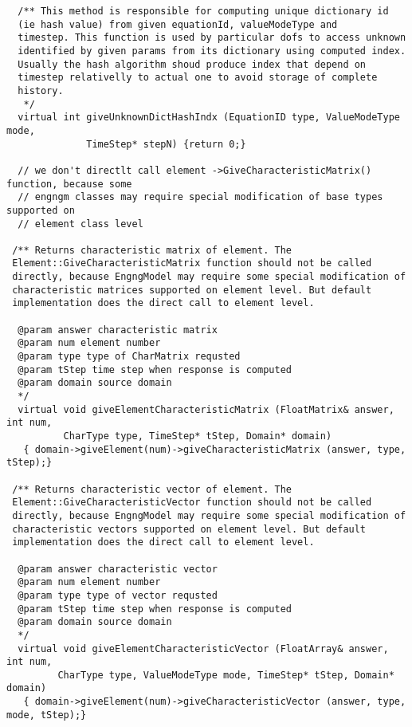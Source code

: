 \documentclass[12pt,draft]{article}
\begin{document}
{\begin{verbatim}
  /** This method is responsible for computing unique dictionary id
  (ie hash value) from given equationId, valueModeType and
  timestep. This function is used by particular dofs to access unknown
  identified by given params from its dictionary using computed index.
  Usually the hash algorithm shoud produce index that depend on
  timestep relativelly to actual one to avoid storage of complete
  history.
   */
  virtual int giveUnknownDictHashIndx (EquationID type, ValueModeType mode, 
              TimeStep* stepN) {return 0;}

  // we don't directlt call element ->GiveCharacteristicMatrix() function, because some
  // engngm classes may require special modification of base types supported on
  // element class level

 /** Returns characteristic matrix of element. The
 Element::GiveCharacteristicMatrix function should not be called
 directly, because EngngModel may require some special modification of
 characteristic matrices supported on element level. But default
 implementation does the direct call to element level.

  @param answer characteristic matrix
  @param num element number
  @param type type of CharMatrix requsted
  @param tStep time step when response is computed
  @param domain source domain
  */
  virtual void giveElementCharacteristicMatrix (FloatMatrix& answer, int num, 
          CharType type, TimeStep* tStep, Domain* domain) 
   { domain->giveElement(num)->giveCharacteristicMatrix (answer, type, tStep);}

 /** Returns characteristic vector of element. The
 Element::GiveCharacteristicVector function should not be called
 directly, because EngngModel may require some special modification of
 characteristic vectors supported on element level. But default
 implementation does the direct call to element level.

  @param answer characteristic vector
  @param num element number
  @param type type of vector requsted
  @param tStep time step when response is computed
  @param domain source domain
  */
  virtual void giveElementCharacteristicVector (FloatArray& answer, int num, 
         CharType type, ValueModeType mode, TimeStep* tStep, Domain* domain) 
   { domain->giveElement(num)->giveCharacteristicVector (answer, type, mode, tStep);}


\end{verbatim}}
\end{document}
